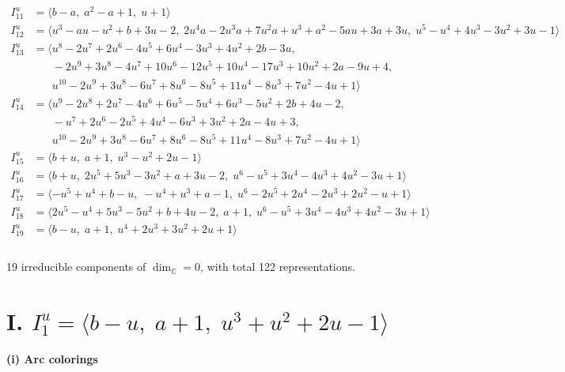 \documentclass[1p]{elsarticle_modified}
\theoremstyle{definition}
\begin{document}
\begin{align*}
I^u_{11}&=\langle 
b- a,\;a^2- a+1,\;u+1\rangle \\
I^u_{12}&=\langle 
u^3- a u- u^2+b+3 u-2,\;2 u^4 a-2 u^3 a+7 u^2 a+u^3+a^2-5 a u+3 a+3 u,\;u^5- u^4+4 u^3-3 u^2+3 u-1\rangle \\
I^u_{13}&=\langle 
u^8-2 u^7+2 u^6-4 u^5+6 u^4-3 u^3+4 u^2+2 b-3 u,\\
\phantom{I^u_{13}}&\phantom{= \langle  }-2 u^9+3 u^8-4 u^7+10 u^6-12 u^5+10 u^4-17 u^3+10 u^2+2 a-9 u+4,\\
\phantom{I^u_{13}}&\phantom{= \langle  }u^{10}-2 u^9+3 u^8-6 u^7+8 u^6-8 u^5+11 u^4-8 u^3+7 u^2-4 u+1\rangle \\
I^u_{14}&=\langle 
u^9-2 u^8+2 u^7-4 u^6+6 u^5-5 u^4+6 u^3-5 u^2+2 b+4 u-2,\\
\phantom{I^u_{14}}&\phantom{= \langle  }- u^7+2 u^6-2 u^5+4 u^4-6 u^3+3 u^2+2 a-4 u+3,\\
\phantom{I^u_{14}}&\phantom{= \langle  }u^{10}-2 u^9+3 u^8-6 u^7+8 u^6-8 u^5+11 u^4-8 u^3+7 u^2-4 u+1\rangle \\
I^u_{15}&=\langle 
b+u,\;a+1,\;u^3- u^2+2 u-1\rangle \\
I^u_{16}&=\langle 
b+u,\;2 u^5+5 u^3-3 u^2+a+3 u-2,\;u^6- u^5+3 u^4-4 u^3+4 u^2-3 u+1\rangle \\
I^u_{17}&=\langle 
- u^5+u^4+b- u,\;- u^4+u^3+a-1,\;u^6-2 u^5+2 u^4-2 u^3+2 u^2- u+1\rangle \\
I^u_{18}&=\langle 
2 u^5- u^4+5 u^3-5 u^2+b+4 u-2,\;a+1,\;u^6- u^5+3 u^4-4 u^3+4 u^2-3 u+1\rangle \\
I^u_{19}&=\langle 
b- u,\;a+1,\;u^4+2 u^3+3 u^2+2 u+1\rangle \\
\\
\end{align*}
\raggedright * 19 irreducible components of $\dim_{\mathbb{C}}=0$, with total 122 representations.\\
\newpage
\renewcommand{\arraystretch}{1}
\centering \section*{I. $I^u_{1}= \langle b- u,\;a+1,\;u^3+u^2+2 u-1 \rangle$}
\flushleft \textbf{(i) Arc colorings}\\
\end{document}

